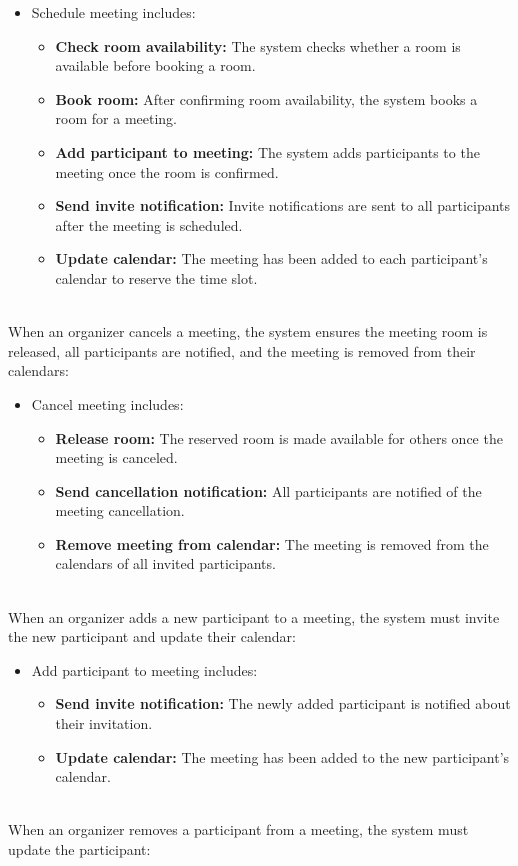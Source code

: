 \begin{itemize}
\item
\protect{}\label{WdN1O3NaN3ovA7Aw86gop}
Schedule meeting includes:

\begin{itemize}
\item
\textbf{Check room availability:} The system checks whether a room is available before booking a room.
\item
\textbf{Book room:} After confirming room availability, the system books a room for a meeting.
\item
\protect{}\label{6gcoOtviSLYgaJTNxRcF3}
\textbf{Add participant to meeting:} The system adds participants to the meeting once the room is confirmed.
\item
\textbf{Send invite notification:} Invite notifications are sent to all participants after the meeting is scheduled.
\item
\textbf{Update calendar:} The meeting has been added to each participant's calendar to reserve the time slot.
\end{itemize}
\end{itemize}
\\
When an organizer cancels a meeting, the system ensures the meeting room is released, all participants are notified, and the meeting is removed from their calendars:

\begin{itemize}
\item
\protect{}\label{qLt5Bvhyld1xwjHVjAnPj}
Cancel meeting includes:

\begin{itemize}
\item
\textbf{Release room:} The reserved room is made available for others once the meeting is canceled.
\item
\textbf{Send cancellation notification:} All participants are notified of the meeting cancellation.
\item
\textbf{Remove meeting from calendar:} The meeting is removed from the calendars of all invited participants.
\end{itemize}
\end{itemize}
\\
When an organizer adds a new participant to a meeting, the system must invite the new participant and update their calendar:

\begin{itemize}
\item
\protect{}\label{6gcoOtviSLYgaJTNxRcF3}
Add participant to meeting includes:

\begin{itemize}
\item
\textbf{Send invite notification:} The newly added participant is notified about their invitation.
\item
\textbf{Update calendar:} The meeting has been added to the new participant's calendar.
\end{itemize}
\end{itemize}
\\
When an organizer removes a participant from a meeting, the system must update the participant:

